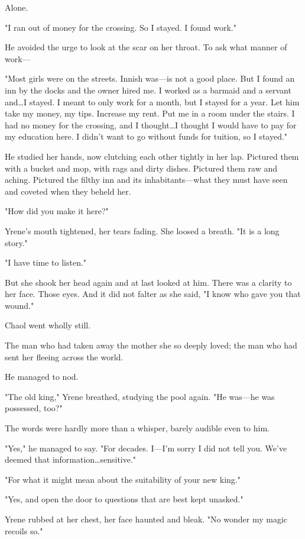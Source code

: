 Alone.

"I ran out of money for the crossing.
So I stayed.
I found work."

He avoided the urge to look at the scar on her throat.
To ask what manner of work---

"Most girls were on the streets.
Innish was---is not a good place.
But I found an inn by the docks and the owner hired me.
I worked as a barmaid and a servant and\ldots I stayed.
I meant to only work for a month, but I stayed for a year.
Let him take my money, my tips.
Increase my rent.
Put me in a room under the stairs.
I had no money for the crossing, and I thought\ldots I thought I would have to pay for my education here.
I didn't want to go without funds for tuition, so 
I stayed."

He studied her hands, now clutching each other tightly in her lap.
Pictured them with a bucket and mop, with rags and dirty dishes.
Pictured them raw and aching.
Pictured the filthy inn and its inhabitants---what they must have seen and coveted when they beheld her.

"How did you make it here?"

Yrene's mouth tightened, her tears fading.
She loosed a breath.
"It is a long story."

"I have time to listen."

But she shook her head again and at last looked at him.
There was a  clarity to her face.
Those eyes.
And it did not falter as she said, "I know who gave you that wound."

Chaol went wholly still.

The man who had taken away the mother she so deeply loved; the man who had sent her fleeing across the world.

He managed to nod.

"The old king," Yrene breathed, studying the pool again.
"He was---he was possessed, too?"

The words were hardly more than a whisper, barely audible even to him.

"Yes," he managed to say.
"For decades.
I---I'm sorry I did not tell you.
We've deemed that information\ldots sensitive."

"For what it might mean about the suitability of your new king."

"Yes, and open the door to questions that are best kept unasked."

Yrene rubbed at her chest, her face haunted and bleak.
"No wonder my magic recoils so."


